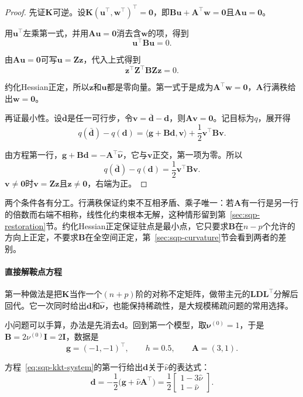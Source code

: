 \begin{proof}
先证$\bm{K}$可逆。设$\bm{K}(\bm{u}^\top,\bm{w}^\top)^\top=\bm{0}$，即$\bm{B}\bm{u}+\bm{A}^\top\bm{w}=\bm{0}$且$\bm{A}\bm{u}=\bm{0}$。

用$\bm{u}^\top$左乘第一式，并用$\bm{A}\bm{u}=\bm{0}$消去含$\bm{w}$的项，得到
\[
 \bm{u}^\top\bm{B}\bm{u}=0.
\]

由$\bm{A}\bm{u}=\bm{0}$可写$\bm{u}=\bm{Z}\bm{z}$，代入上式得到
\[
 \bm{z}^\top\bm{Z}^\top\bm{B}\bm{Z}\bm{z}=0.
\]

约化Hessian正定，所以$\bm{z}$和$\bm{u}$都是零向量。第一式于是成为$\bm{A}^\top\bm{w}=\bm{0}$，$\bm{A}$行满秩给出$\bm{w}=\bm{0}$。

再证最小性。设$\bar{\bm{d}}$是任一可行步，令$\bm{v}=\bar{\bm{d}}-\bm{d}$，则$\bm{A}\bm{v}=\bm{0}$。记目标为$q$，展开得
\[
 q(\bar{\bm{d}})-q(\bm{d})=\langle\bm{g}+\bm{B}\bm{d},\bm{v}\rangle+\frac12\bm{v}^\top\bm{B}\bm{v}.
\]

由方程第一行，$\bm{g}+\bm{B}\bm{d}=-\bm{A}^\top\hat{\bm{\nu}}$，它与$\bm{v}$正交，第一项为零。所以
\[
 q(\bar{\bm{d}})-q(\bm{d})=\frac12\bm{v}^\top\bm{B}\bm{v}.
\]
$\bm{v}\neq\bm{0}$时$\bm{v}=\bm{Z}\bm{z}$且$\bm{z}\neq\bm{0}$，右端为正。
\end{proof}

两个条件各有分工。行满秩保证约束不互相矛盾、乘子唯一：若$\bm{A}$有一行是另一行的倍数而右端不相称，线性化约束根本无解，这种情形留到第~\ref{sec:sqp-restoration}节。约化Hessian正定保证驻点是最小点，它只要求$\bm{B}$在$n-p$个允许的方向上正定，不要求$\bm{B}$在全空间正定，第~\ref{sec:sqp-curvature}节会看到两者的差别。

\paragraph{直接解鞍点方程}
第一种做法是把$\bm{K}$当作一个$(n+p)$阶的对称不定矩阵，做带主元的$\bm{L}\bm{D}\bm{L}^\top$分解后回代。它一次同时给出$\bm{d}$和$\hat{\bm{\nu}}$，也能保持稀疏性，是大规模稀疏问题的常用选择。

小问题可以手算，办法是先消去$\bm{d}$。回到第一个模型，取$\bm{\nu}^{(0)}=1$，于是$\bm{B}=2\nu^{(0)}\bm{I}=2\bm{I}$，数据是
\[
 \bm{g}=(-1,-1)^\top,\qquad h=0.5,\qquad \bm{A}=(3,1).
\]

方程~\eqref{eq:sqp-kkt-system}的第一行给出$\bm{d}$关于$\hat\nu$的表达式：
\[
 \bm{d}=-\frac12\bigl(\bm{g}+\hat\nu\bm{A}^\top\bigr)=\frac12\begin{bmatrix}1-3\hat\nu\\1-\hat\nu\end{bmatrix}.
\]

